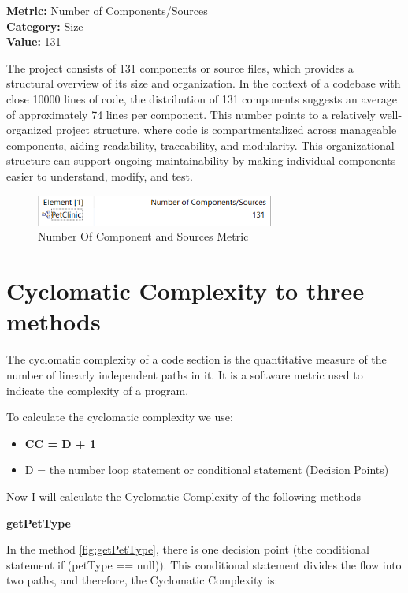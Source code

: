 \documentclass[a4paper,11pt,openright,BCOR=15mm]{scrbook}
\begin{document}
\textbf{Metric:} Number of Components/Sources \\
\textbf{Category:} Size \\
\textbf{Value:} 131

The project consists of 131 components or source files, which provides a structural overview of its size and organization. In the context of a codebase with close 10000 lines of code, the distribution of 131 components suggests an average of approximately 74 lines per component. This number points to a relatively well-organized project structure, where code is compartmentalized across manageable components, aiding readability, traceability, and modularity. This organizational structure can support ongoing maintainability by making individual components easier to understand, modify, and test.

\begin{figure}[H]
	\centering
	\includegraphics[width=0.7\textwidth]{figs/Maintainability/NumberOfComponent-Sources.png}
	\caption{Number Of Component and Sources Metric}
	\label{fig:NumberOfComponent-Sources}
  \end{figure}




\section{Cyclomatic Complexity to three methods}
The cyclomatic complexity of a code section is the quantitative measure of the number of linearly independent paths in it. It is a software metric used to indicate the complexity of a program. 

To calculate the cyclomatic complexity we use:
\begin{itemize}
	\item \textbf{CC = D + 1}
	\item D = the number loop statement or conditional statement (Decision Points) 

\end{itemize}

Now I will calculate the Cyclomatic Complexity of the following methods


\textbf{getPetType}


In the method \ref{fig:getPetType}, there is one decision point (the conditional statement if (petType == null)). This conditional statement divides the flow into two paths, and therefore, the Cyclomatic Complexity is:
\end{document}
